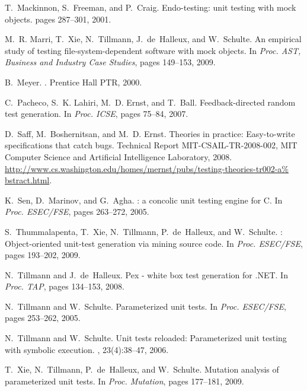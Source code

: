 \documentclass{sig-alternate}
\begin{document}
\begin{thebibliography}{10}
\begin{scriptsize}
T.~Mackinnon, S.~Freeman, and P.~Craig.
\newblock Endo-testing: unit testing with mock objects.
\newblock pages 287--301, 2001.

M.~R. Marri, T.~Xie, N.~Tillmann, J.~de~Halleux, and W.~Schulte.
\newblock An empirical study of testing file-system-dependent software with
  mock objects.
\newblock In {\em Proc. AST, Business and Industry Case Studies}, pages
  149--153, 2009.

B.~Meyer.
.
\newblock Prentice Hall PTR, 2000.

C.~Pacheco, S.~K. Lahiri, M.~D. Ernst, and T.~Ball.
\newblock Feedback-directed random test generation.
\newblock In {\em Proc. ICSE}, pages 75--84, 2007.

D.~Saff, M.~Boshernitsan, and M.~D. Ernst.
\newblock Theories in practice: Easy-to-write specifications that catch bugs.
\newblock Technical Report MIT-CSAIL-TR-2008-002, MIT Computer Science and
  Artificial Intelligence Laboratory, 2008.
\newblock
  \url{http://www.cs.washington.edu/homes/mernst/pubs/testing-theories-tr002-a%
bstract.html}.

K.~Sen, D.~Marinov, and G.~Agha.
: a concolic unit testing engine for {C}.
\newblock In {\em Proc. ESEC/FSE}, pages 263--272, 2005.

S.~Thummalapenta, T.~Xie, N.~Tillmann, P.~de~Halleux, and W.~Schulte.
: Object-oriented unit-test generation via mining source
  code.
\newblock In {\em Proc. ESEC/FSE}, pages 193--202, 2009.

N.~Tillmann and J.~de~Halleux.
\newblock Pex - white box test generation for {.NET}.
\newblock In {\em Proc. TAP}, pages 134--153, 2008.

N.~Tillmann and W.~Schulte.
\newblock Parameterized unit tests.
\newblock In {\em Proc. ESEC/FSE}, pages 253--262, 2005.

N.~Tillmann and W.~Schulte.
\newblock Unit tests reloaded: {P}arameterized unit testing with symbolic
  execution.
, 23(4):38--47, 2006.

T.~Xie, N.~Tillmann, P.~de~Halleux, and W.~Schulte.
\newblock Mutation analysis of parameterized unit tests.
\newblock In {\em Proc. Mutation}, pages 177--181, 2009.

\end{scriptsize}
\end{thebibliography}
\end{document}
